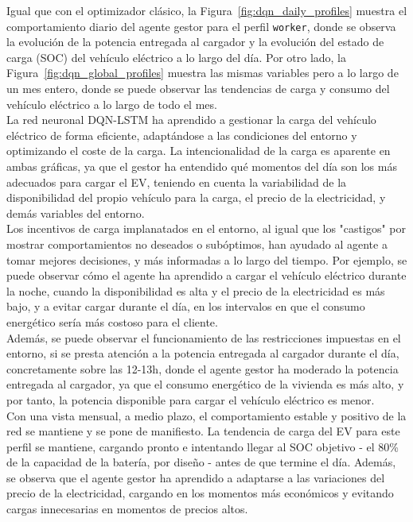 Igual que con el optimizador clásico, la Figura~\ref{fig:dqn_daily_profiles} muestra el
comportamiento diario del agente gestor para el perfil \texttt{worker}, donde se observa la
evolución de la potencia entregada al cargador y la evolución del estado de carga (SOC) del
vehículo eléctrico a lo largo del día. Por otro lado, la Figura~\ref{fig:dqn_global_profiles}
muestra las mismas variables pero a lo largo de un mes entero, donde se puede observar las
tendencias de carga y consumo del vehículo eléctrico a lo largo de todo el mes.\\

La red neuronal DQN-LSTM ha aprendido a gestionar la carga del vehículo eléctrico de forma
eficiente, adaptándose a las condiciones del entorno y optimizando el coste de la carga. La 
intencionalidad de la carga es aparente en ambas gráficas, ya que el gestor ha entendido qué 
momentos del día son los más adecuados para cargar el EV, teniendo en cuenta la variabilidad de la 
disponibilidad del propio vehículo para la carga, el precio de la electricidad, y demás variables
del entorno.\\

Los incentivos de carga implanatados en el entorno, al igual que los "castigos" por mostrar 
comportamientos no deseados o subóptimos, han ayudado al agente a tomar mejores decisiones, y más
informadas a lo largo del tiempo. Por ejemplo, se puede observar cómo el agente ha aprendido a
cargar el vehículo eléctrico durante la noche, cuando la disponibilidad es alta y el precio de la
electricidad es más bajo, y a evitar cargar durante el día, en los intervalos en que el consumo 
energético sería más costoso para el cliente.\\

Además, se puede observar el funcionamiento de las restricciones impuestas en el entorno, si se 
presta atención a la potencia entregada al cargador durante el día, concretamente sobre las 12-13h, 
donde el agente gestor ha moderado la potencia entregada al cargador, ya que el consumo energético 
de la vivienda es más alto, y por tanto, la potencia disponible para cargar el vehículo eléctrico 
es menor.\\

Con una vista mensual, a medio plazo, el comportamiento estable y positivo de la red se mantiene y
se pone de manifiesto. La tendencia de carga del EV para este perfil se mantiene, cargando pronto
e intentando llegar al SOC objetivo - el 80\% de la capacidad de la batería, por diseño - antes de
que termine el día. Además, se observa que el agente gestor ha aprendido a adaptarse a las
variaciones del precio de la electricidad, cargando en los momentos más económicos y evitando
cargas innecesarias en momentos de precios altos.\\

